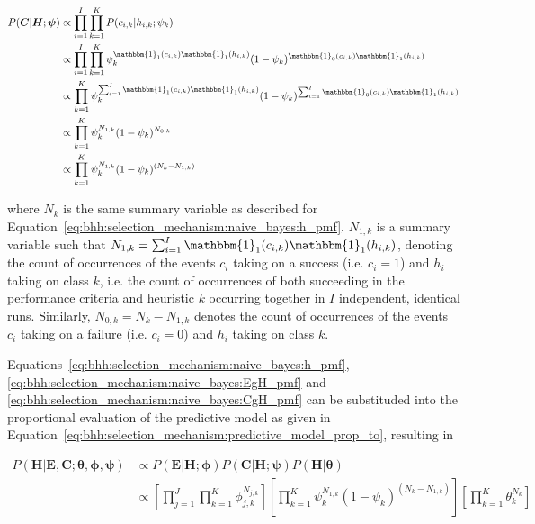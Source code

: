 \begin{equation}
      \label{eq:bhh:selection_mechanism:naive_bayes:CgH_pmf}
      \begin{split}
            P(\boldsymbol{C} \vert \boldsymbol{H}; \boldsymbol{\psi})
            &\propto\prod_{i=1}^{I} \prod_{k=1}^{K} P(c_{i,k} \vert h_{i,k} ; \psi_{k})  \\
            &\propto \prod_{i=1}^{I} \prod_{k=1}^{K} \psi_{k}^{\mathbbm{1}_{1}(c_{i,k})\mathbbm{1}_{1}(h_{i,k})} (1 - \psi_{k})^{\mathbbm{1}_{0}(c_{i,k})\mathbbm{1}_{1}(h_{i,k})}\\
            &\propto \prod_{k=1}^{K} \psi_{k}^{\sum_{i=1}^{I} \mathbbm{1}_{1}(c_{i,k})\mathbbm{1}_{1}(h_{i,k})} (1 - \psi_{k})^{\sum_{i=1}^{I} \mathbbm{1}_{0}(c_{i,k})\mathbbm{1}_{1}(h_{i,k})}\\
            &\propto \prod_{k=1}^{K} \psi_{k}^{N_{1,k}} (1 - \psi_{k})^{N_{0,k}} \\
            &\propto \prod_{k=1}^{K} \psi_{k}^{N_{1,k}} (1 - \psi_{k})^{(N_{k} - N_{1,k})}
      \end{split}
\end{equation}

where $N_{k}$ is the same summary variable as described for Equation~\eqref{eq:bhh:selection_mechanism:naive_bayes:h_pmf}. $N_{1,k}$ is a summary variable such that $N_{1,k} = \sum_{i=1}^{I} \mathbbm{1}_{1}(c_{i,k})\mathbbm{1}_{1}(h_{i,k})$, denoting the count of occurrences of the events $c_{i}$ taking on a success (i.e. $c_{i}=1$) and $h_{i}$ taking on class $k$, i.e. the count of occurrences of both succeeding in the performance criteria and heuristic $k$ occurring together in $I$ independent, identical runs. Similarly, $N_{0,k} = N_{k} - N_{1,k}$ denotes the count of occurrences of the events $c_{i}$ taking on a failure (i.e. $c_{i}=0$) and $h_{i}$ taking on class $k$.

Equations~\eqref{eq:bhh:selection_mechanism:naive_bayes:h_pmf}, \eqref{eq:bhh:selection_mechanism:naive_bayes:EgH_pmf} and \eqref{eq:bhh:selection_mechanism:naive_bayes:CgH_pmf} can be substituded into the proportional evaluation of the predictive model as given in Equation~\eqref{eq:bhh:selection_mechanism:predictive_model_prop_to}, resulting in

\begin{equation}
      \label{eq:bhh:selection_mechanism:naive_bayes:HgEC_pmf}
      \begin{split}
            P(\boldsymbol{H} \vert \boldsymbol{E}, \boldsymbol{C};  \boldsymbol{\theta}, \boldsymbol{\phi}, \boldsymbol{\psi})
            &\propto P(\boldsymbol{E} \vert \boldsymbol{H};  \boldsymbol{\phi})  P(\boldsymbol{C} \vert \boldsymbol{H}; \boldsymbol{\psi}) P(\boldsymbol{H} \vert \boldsymbol{\theta})  \\
            &\propto \left[ \prod_{j=1}^{J} \prod_{k=1}^{K} \phi_{j,k}^{N_{j,k}} \right] \left[ \prod_{k=1}^{K} \psi_{k}^{N_{1,k}} (1 - \psi_{k})^{(N_{k} - N_{1,k})} \right] \left[ \prod_{k=1}^{K} \theta_{k}^{N_{k}} \right]
      \end{split}
\end{equation}

